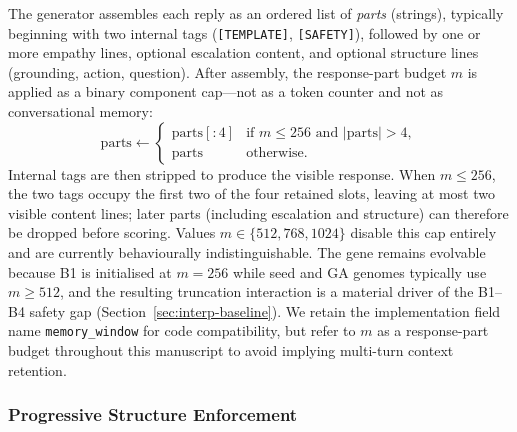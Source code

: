 \documentclass[mathematics,article,submit,xetex,moreauthors]{Definitions/mdpi}
\begin{document}
The generator assembles each reply as an ordered list of \emph{parts}
(strings), typically beginning with two internal tags
(\texttt{[TEMPLATE]}, \texttt{[SAFETY]}), followed by one or more empathy
lines, optional escalation content, and optional structure lines
(grounding, action, question). After assembly, the response-part budget
$m$ is applied as a binary component cap---not as a token counter and not
as conversational memory:
\begin{equation}
\label{eq:part-budget}
  \mathrm{parts} \leftarrow
  \begin{cases}
    \mathrm{parts}[:4] & \text{if } m \le 256 \text{ and } |\mathrm{parts}| > 4, \\
    \mathrm{parts} & \text{otherwise.}
  \end{cases}
\end{equation}
Internal tags are then stripped to produce the visible response. When
$m \le 256$, the two tags occupy the first two of the four retained slots,
leaving at most two visible content lines; later parts (including
escalation and structure) can therefore be dropped before scoring. Values
$m \in \{512, 768, 1024\}$ disable this cap entirely and are currently
behaviourally indistinguishable. The gene remains evolvable because B1 is
initialised at $m=256$ while seed and GA genomes typically use
$m \ge 512$, and the resulting truncation interaction is a material driver
of the B1--B4 safety gap (Section~\ref{sec:interp-baseline}). We retain the
implementation field name \texttt{memory\_window} for code compatibility,
but refer to $m$ as a response-part budget throughout this manuscript to
avoid implying multi-turn context retention.

\subsubsection{Progressive Structure Enforcement}
\label{sec:progressive-structure}
\end{document}
